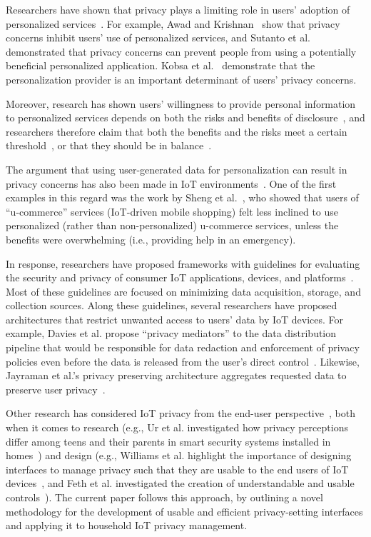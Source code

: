 Researchers have shown that privacy plays a limiting role in users' adoption of personalized services~\cite{teltzrow_2004}.  For example, Awad and Krishnan~\cite{awad_2006} show that privacy concerns inhibit users' use of personalized services, and Sutanto et al.~\cite{sutanto_2013} demonstrated that privacy concerns can prevent people from using a potentially beneficial personalized application. Kobsa et al.~\cite{kobsa_2016} demonstrate that the personalization provider is an important determinant of users' privacy concerns.

Moreover, research has shown  users' willingness to provide personal information to personalized services depends on both the risks and benefits of disclosure~\cite{phelps_2000,ho_2006,hui_2006}, and researchers therefore claim that both the benefits and the risks meet a certain threshold~\cite{treiblmaier_2007}, or that they should be in balance~\cite{chellappa_2005}.

The argument that using user-generated data for personalization can result in privacy concerns has also been made in IoT environments~\cite{worthy_trust_2016}. One of the first examples in this regard was the work by Sheng et al.~\cite{sheng_experimental_2008}, who showed that users of ``u-commerce'' services (IoT-driven mobile shopping) felt less inclined to use personalized (rather than non-personalized) u-commerce services, unless the benefits were overwhelming (i.e., providing help in an emergency).

In response, researchers have proposed frameworks with guidelines for evaluating the security and privacy of consumer IoT applications, devices, and platforms~\cite{perera_privacy-by-design_2016, loi_systematically_2017}. Most of these guidelines are focused on minimizing data acquisition, storage, and collection sources. Along these guidelines, several researchers have proposed architectures that restrict unwanted access to users' data by IoT devices. For example, Davies et al. propose ``privacy mediators'' to the data distribution pipeline that would be responsible for data redaction and enforcement of privacy policies even before the data is released from the user's direct control~\cite{davies_privacy_2016}. Likewise, Jayraman et al.'s privacy preserving architecture aggregates requested data to preserve user privacy~\cite{jayaraman_privacy_2017}.

Other research has considered IoT privacy from the end-user perspective~\cite{feth_user-centered_2017}, both when it comes to research (e.g., Ur et al. investigated how privacy perceptions differ among teens and their parents in smart security systems installed in homes~\cite{ur_intruders_2014}) and design (e.g., Williams et al. highlight the importance of designing interfaces to manage privacy such that they are usable to the end users of IoT devices~\cite{williams2016perfect}, and Feth et al. investigated the creation of understandable and usable controls~\cite{feth_user-centered_2017}). The current paper follows this approach, by outlining a novel methodology for the development of usable and efficient privacy-setting interfaces and applying it to household IoT privacy management. 

